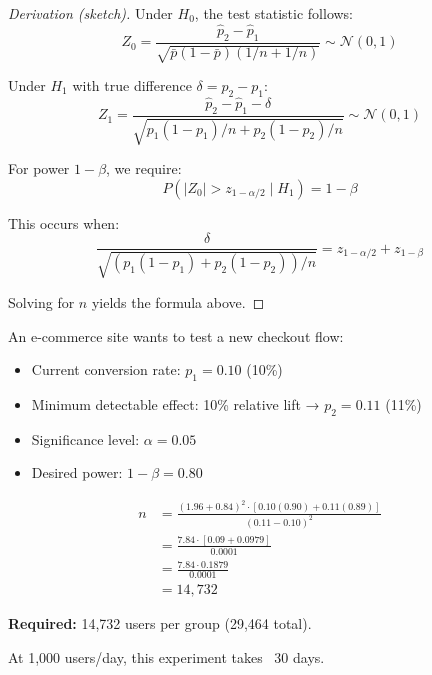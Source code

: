 \begin{proof}[Derivation (sketch)]
Under $H_0$, the test statistic follows:
\begin{equation}
Z_0 = \frac{\hat{p}_2 - \hat{p}_1}{\sqrt{\bar{p}(1-\bar{p})(1/n + 1/n)}} \sim \mathcal{N}(0, 1)
\end{equation}

Under $H_1$ with true difference $\delta = p_2 - p_1$:
\begin{equation}
Z_1 = \frac{\hat{p}_2 - \hat{p}_1 - \delta}{\sqrt{p_1(1-p_1)/n + p_2(1-p_2)/n}} \sim \mathcal{N}(0, 1)
\end{equation}

For power $1-\beta$, we require:
\begin{equation}
P(|Z_0| > z_{1-\alpha/2} \mid H_1) = 1 - \beta
\end{equation}

This occurs when:
\begin{equation}
\frac{\delta}{\sqrt{(p_1(1-p_1) + p_2(1-p_2))/n}} = z_{1-\alpha/2} + z_{1-\beta}
\end{equation}

Solving for $n$ yields the formula above.
\end{proof}

\begin{example}
An e-commerce site wants to test a new checkout flow:
\begin{itemize}
    \item Current conversion rate: $p_1 = 0.10$ (10\%)
    \item Minimum detectable effect: 10\% relative lift → $p_2 = 0.11$ (11\%)
    \item Significance level: $\alpha = 0.05$
    \item Desired power: $1 - \beta = 0.80$
\end{itemize}

\begin{align}
n &= \frac{(1.96 + 0.84)^2 \cdot [0.10(0.90) + 0.11(0.89)]}{(0.11 - 0.10)^2} \\
  &= \frac{7.84 \cdot [0.09 + 0.0979]}{0.0001} \\
  &= \frac{7.84 \cdot 0.1879}{0.0001} \\
  &= 14,732
\end{align}

\textbf{Required:} 14,732 users per group (29,464 total).

At 1,000 users/day, this experiment takes ~30 days.
\end{example}

